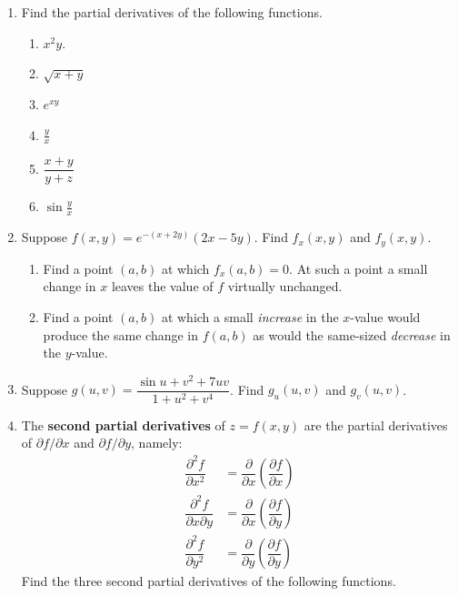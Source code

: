 \begin{enumerate}
\item Find the partial derivatives of the following functions.

  \begin{enumerate}
  \item $x^2 y$.

  \item $\sqrt{x + y}$

  \item $e^{xy}$

  \item $\displaystyle{\frac{y}{x}}$

  \item $\dfrac{x + y}{y + z}$

  \item $\sin{\displaystyle{\frac{y}{x}}}$


\end{enumerate}
\item Suppose $f(x,y) = \displaystyle{e^{-(x+2y)}(2x - 5y)}$.  Find
$f_x(x,y)$ and $f_y(x,y)$.

  \begin{enumerate}
  \item Find a point $(a, b)$ at which $f_x(a,b)=0$.  At such a point a
small change in $x$ leaves the value of $f$ virtually unchanged.

  \item Find a point $(a, b)$ at which a small {\em increase} in the
$x$-value would produce the same change in $f(a,b)$ as would the
same-sized {\em decrease} in the $y$-value.


\end{enumerate}
\item Suppose $g(u,v) = \dfrac{\sin{u+v^2}+7uv}{1+u^2+v^4}$.  Find
$g_u(u,v)$ and $g_v(u,v)$.


\item The {\bf second partial derivatives} of $z
= f(x, y)$ are the partial derivatives of $\partial f/\partial x$ and
$\partial f/\partial y$, namely:
\begin{align*}
\dfrac{\partial ^2 f}{\partial x ^2} & = 
		\dfrac{\partial}{\partial x} \left( 
		\dfrac{\partial f}{\partial x} \right) \\[4pt]
\dfrac{\partial ^2 f}{\partial x \partial y} & = 
		\dfrac{\partial}{\partial x} \left( 
		\dfrac{\partial f}{\partial y} \right) \\[4pt]
\dfrac{\partial ^2 f}{\partial y ^2} & = 
		\dfrac{\partial}{\partial y} \left( 
		\dfrac{\partial f}{\partial y} \right) 
\end{align*}
Find the three second partial derivatives of the following functions.


\end{enumerate}
